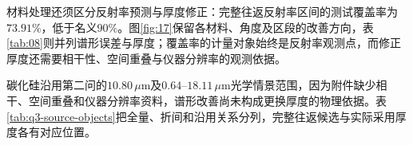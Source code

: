 材料处理还须区分反射率预测与厚度修正：完整往返反射率区间的测试覆盖率为$73.91\%$，低于名义$90\%$。图\ref{fig:17}保留各材料、角度及区段的改善方向，表\ref{tab:08}则并列谱形误差与厚度；覆盖率的计量对象始终是反射率观测点，而修正厚度还需要相干性、空间重叠与仪器分辨率的观测依据。

碳化硅沿用第二问的$10.80\,\mu\mathrm{m}$及$0.64$--$18.11\,\mu\mathrm{m}$光学情景范围，因为附件缺少相干、空间重叠和仪器分辨率资料，谱形改善尚未构成更换厚度的物理依据。表\ref{tab:q3-source-objects}把全量、折间和沿用关系分列，完整往返候选与实际采用厚度各有对应位置。

